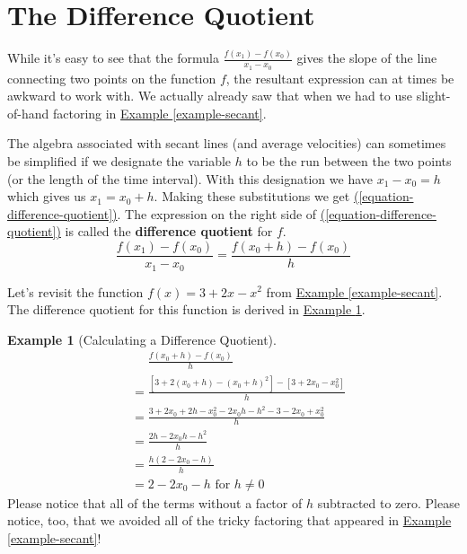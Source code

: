 \documentclass[12pt,]{book}
\newcommand{\terminology}[1]{\textbf{#1}}
\theoremstyle{plain}
\theoremstyle{definition}
\newtheorem{example}[theorem]{Example}
\numberwithin{equation}{section}
\newcommand{\fe}[2]{#1\mathopen{}\left(#2\right)\mathclose{}}
\begin{document}
\section[The Difference Quotient]{The Difference Quotient}\label{section-difference-quotient}
While it's easy to see that the formula \(\frac{\fe{f}{x_1}-\fe{f}{x_0}}{x_1-x_0}\) gives the slope of the line connecting two points on the function \(f\), the resultant expression can at times be awkward to work with. We actually already saw that when we had to use slight-of-hand factoring in \hyperref[example-secant]{Example \ref{example-secant}}.%
\par
The algebra associated with secant lines (and average velocities) can sometimes be simplified if we designate the variable \(h\) to be the run between the two points (or the length of the time interval). With this designation we have \(x_1-x_0=h\) which gives us \(x_1=x_0+h\). Making these substitutions we get \hyperref[equation-difference-quotient]{(\ref{equation-difference-quotient})}. The expression on the right side of \hyperref[equation-difference-quotient]{(\ref{equation-difference-quotient})} is called the \terminology{difference quotient} for \(f\).%
\begin{equation}\frac{\fe{f}{x_1}-\fe{f}{x_0}}{x_1-x_0}=\frac{\fe{f}{x_0+h}-\fe{f}{x_0}}{h}\label{equation-difference-quotient}\end{equation}\par
Let's revisit the function \(\fe{f}{x}=3+2x-x^2\) from \hyperref[example-secant]{Example \ref{example-secant}}. The difference quotient for this function is derived in \hyperref[example-difference-quotient]{Example \ref{example-difference-quotient}}.%
\begin{example}[Calculating a Difference Quotient]\label{example-difference-quotient}
\begin{align*}
&\phantom{{}={}}\frac{\fe{f}{x_0+h}-\fe{f}{x_0}}{h}\\
&=\frac{\left[3+2\left(x_0+h\right)-\left(x_0+h\right)^2\right]-\left[3+2x_0-x_0^2\right]}{h}\\
&=\frac{3+2x_0+2h-x_0^2-2x_0h-h^2-3-2x_0+x_0^2}{h}\\
&=\frac{2h-2x_0h-h^2}{h}\\
&=\frac{h\left(2-2x_0-h\right)}{h}\\
&=2-2x_0-h\text{ for }h\neq 0
\end{align*}Please notice that all of the terms without a factor of \(h\) subtracted to zero. Please notice, too, that we avoided all of the tricky factoring that appeared in \hyperref[example-secant]{Example \ref{example-secant}}!%
\end{example}
\end{document}

